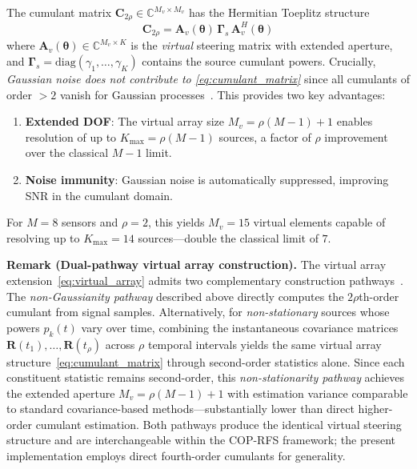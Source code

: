 \documentclass[journal]{IEEEtran}
\newcommand{\vect}[1]{\boldsymbol{#1}}
\newcommand{\mat}[1]{\mathbf{#1}}
\newcommand{\C}{\mathbb{C}}
\newcommand{\diag}{\mathrm{diag}}
\begin{document}
The cumulant matrix $\mat{C}_{2\rho} \in \C^{M_v \times M_v}$ has the Hermitian Toeplitz structure
\begin{equation}
\mat{C}_{2\rho} = \mat{A}_v(\vect{\theta})\,\mat{\Gamma}_s\,\mat{A}_v^H(\vect{\theta})
\label{eq:cumulant_matrix}
\end{equation}
where $\mat{A}_v(\vect{\theta}) \in \C^{M_v \times K}$ is the \emph{virtual} steering matrix with extended aperture, and $\mat{\Gamma}_s = \diag(\gamma_1, \ldots, \gamma_K)$ contains the source cumulant powers. Crucially, \emph{Gaussian noise does not contribute to \eqref{eq:cumulant_matrix}} since all cumulants of order $> 2$ vanish for Gaussian processes~\cite{mendel1991tutorial}. This provides two key advantages:
\begin{enumerate}
\item \textbf{Extended DOF}: The virtual array size $M_v = \rho(M-1)+1$ enables resolution of up to $K_{\max} = \rho(M-1)$ sources, a factor of $\rho$ improvement over the classical $M-1$ limit.
\item \textbf{Noise immunity}: Gaussian noise is automatically suppressed, improving SNR in the cumulant domain.
\end{enumerate}

For $M = 8$ sensors and $\rho = 2$, this yields $M_v = 15$ virtual elements capable of resolving up to $K_{\max} = 14$ sources---double the classical limit of $7$.

\textbf{Remark (Dual-pathway virtual array construction).}
The virtual array extension~\eqref{eq:virtual_array} admits two complementary construction pathways~\cite{choi2015underdetermined}. The \emph{non-Gaussianity pathway} described above directly computes the $2\rho$th-order cumulant from signal samples. Alternatively, for \emph{non-stationary} sources whose powers $p_k(t)$ vary over time, combining the instantaneous covariance matrices $\mat{R}(t_1), \ldots, \mat{R}(t_\rho)$ across $\rho$ temporal intervals yields the same virtual array structure~\eqref{eq:cumulant_matrix} through second-order statistics alone. Since each constituent statistic remains second-order, this \emph{non-stationarity pathway} achieves the extended aperture $M_v = \rho(M{-}1){+}1$ with estimation variance comparable to standard covariance-based methods---substantially lower than direct higher-order cumulant estimation. Both pathways produce the identical virtual steering structure and are interchangeable within the COP-RFS framework; the present implementation employs direct fourth-order cumulants for generality.
\end{document}
